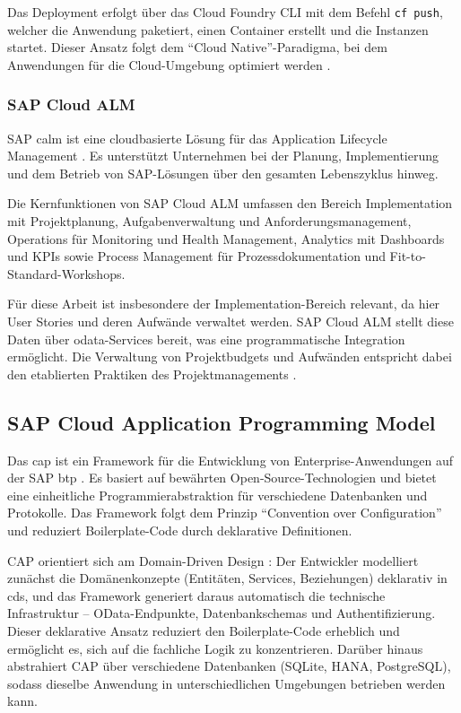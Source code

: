 Das Deployment erfolgt über das Cloud Foundry CLI mit dem Befehl \texttt{cf push}, welcher die Anwendung paketiert, einen Container erstellt und die Instanzen startet. Dieser Ansatz folgt dem \enquote{Cloud Native}-Paradigma, bei dem Anwendungen für die Cloud-Umgebung optimiert werden \citep{davis2019}.

\subsubsection{SAP Cloud ALM}

SAP \gls{calm} ist eine cloudbasierte Lösung für das Application Lifecycle Management \citep{sap2024calm}. Es unterstützt Unternehmen bei der Planung, Implementierung und dem Betrieb von SAP-Lösungen über den gesamten Lebenszyklus hinweg.

Die Kernfunktionen von SAP Cloud ALM umfassen den Bereich Implementation mit Projektplanung, Aufgabenverwaltung und Anforderungsmanagement, Operations für Monitoring und Health Management, Analytics mit Dashboards und KPIs sowie Process Management für Prozessdokumentation und Fit-to-Standard-Workshops.

Für diese Arbeit ist insbesondere der Implementation-Bereich relevant, da hier User Stories und deren Aufwände verwaltet werden. SAP Cloud ALM stellt diese Daten über \gls{odata}-Services bereit, was eine programmatische Integration ermöglicht. Die Verwaltung von Projektbudgets und Aufwänden entspricht dabei den etablierten Praktiken des Projektmanagements \citep{kerzner2017, pmi2021}.

\subsection{SAP Cloud Application Programming Model}

Das \gls{cap} ist ein Framework für die Entwicklung von Enterprise-Anwendungen auf der SAP \gls{btp} \citep{sap2024cap}. Es basiert auf bewährten Open-Source-Technologien und bietet eine einheitliche Programmierabstraktion für verschiedene Datenbanken und Protokolle. Das Framework folgt dem Prinzip \enquote{Convention over Configuration} und reduziert Boilerplate-Code durch deklarative Definitionen.

CAP orientiert sich am Domain-Driven Design \citep{evans2003}: Der Entwickler modelliert zunächst die Domänenkonzepte (Entitäten, Services, Beziehungen) deklarativ in \gls{cds}, und das Framework generiert daraus automatisch die technische Infrastruktur -- OData-Endpunkte, Datenbankschemas und Authentifizierung. Dieser deklarative Ansatz reduziert den Boilerplate-Code erheblich und ermöglicht es, sich auf die fachliche Logik zu konzentrieren. Darüber hinaus abstrahiert CAP über verschiedene Datenbanken (SQLite, HANA, PostgreSQL), sodass dieselbe Anwendung in unterschiedlichen Umgebungen betrieben werden kann.

